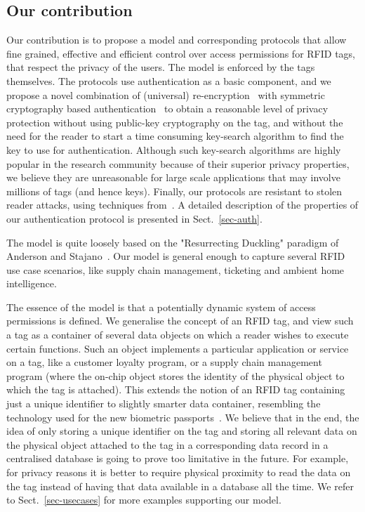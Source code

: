 \subsection{Our contribution}

Our contribution is to propose a model and corresponding protocols that
allow fine grained, effective and efficient control over access
permissions for RFID tags, that respect the privacy of the users. The model is
enforced by the tags themselves. The protocols use authentication as a basic
component, and we propose a novel combination of
(universal) re-encryption~\cite{juels2003squealing,golle2004reencryption}
with symmetric cryptography based authentication~\cite{ISO9798-2}
to obtain a reasonable level of privacy
protection without using public-key cryptography on the tag, and without the
need for the reader to start a time consuming key-search algorithm to
find the key to use for authentication. Although such key-search algorithms are
highly popular in the research community because of their superior privacy
properties, we believe they are unreasonable for large scale applications that
may involve millions of tags (and hence keys). 
Finally, our protocols are resistant to stolen
reader attacks, using techniques from~\cite{avoine2009compromised-readers}.
A detailed description of the properties of our authentication protocol is
presented in Sect.~\ref{sec-auth}.

The model is quite loosely based on the "Resurrecting Duckling" paradigm of Anderson
and Stajano~\cite{StaA99,stajano2000duckling-what-next}.
Our model is general enough to capture several RFID
use case scenarios, like supply chain management, ticketing and ambient
home intelligence. 

The essence of the model is that a potentially dynamic system of access
permissions is defined. We generalise the concept of an RFID tag, and view such
a tag as a container of several data objects on which a reader wishes to 
execute certain functions. 
Such an object implements a particular application or
service on a tag, like a customer loyalty program, or a supply chain management
program (where the on-chip object stores the identity of the physical object to
which the tag is 
attached). This extends the notion of an RFID tag containing just a unique
identifier to slightly smarter data container, resembling the technology used
for the new biometric passports~\cite{hoepman2006crossingborders}. We believe
that in the end, the idea of only storing a unique identifier on the tag and
storing all relevant data on the physical object attached to the tag in a
corresponding data record in a centralised database is going to prove too
limitative in the future. For example, for privacy reasons it is better to
require physical proximity to read the data on the tag instead of having
that data available in a database all the time.
We refer to Sect.~\ref{sec-usecases} for more examples supporting our model. 


